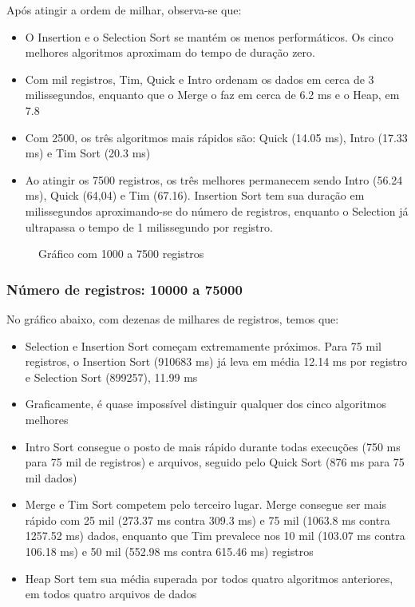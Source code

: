 \documentclass[a4paper,12pt]{scrartcl}
\begin{document}
Após atingir a ordem de milhar, observa-se que:
\begin{itemize}
    \item
    O Insertion e o Selection Sort se mantém os menos performáticos. Os cinco melhores algoritmos aproximam do tempo de duração zero.
    
    \item
    Com mil registros, Tim, Quick e Intro ordenam os dados em cerca de 3 milissegundos, enquanto que o Merge o faz em cerca de 6.2 ms e o Heap, em 7.8
    
    \item
    Com 2500, os três algoritmos mais rápidos são: Quick (14.05 ms), Intro (17.33 ms) e Tim Sort (20.3 ms)

    \item
    Ao atingir os 7500 registros, os três melhores permanecem sendo Intro (56.24 ms), Quick (64,04) e Tim (67.16). Insertion Sort tem sua duração em milissegundos aproximando-se do número de registros, enquanto o Selection já ultrapassa o tempo de 1 milissegundo por registro.


\end{itemize}

\begin{figure}[H]
    \centering
    
    \caption{Gráfico com 1000 a 7500 registros}
    \label{mapaSelect}
\end{figure}

\subsubsection{Número de registros: 10000 a 75000}

No gráfico abaixo, com dezenas de milhares de registros, temos que:
\begin{itemize}
    \item
    Selection e Insertion Sort começam extremamente próximos. Para 75 mil registros, o Insertion Sort (910683 ms) já leva em média 12.14 ms por registro e Selection Sort (899257), 11.99 ms
    
    \item
    Graficamente, é quase impossível distinguir qualquer dos cinco algoritmos melhores
    
    \item
    Intro Sort consegue o posto de mais rápido durante todas execuções (750 ms para 75 mil de registros) e arquivos, seguido pelo Quick Sort (876 ms para 75 mil dados)
    
    \item Merge e Tim Sort competem pelo terceiro lugar. Merge consegue ser mais rápido com 25 mil (273.37 ms contra 309.3 ms) e 75 mil (1063.8 ms contra 1257.52 ms) dados, enquanto que Tim prevalece nos 10 mil (103.07 ms contra 106.18 ms) e 50 mil (552.98 ms contra 615.46 ms) registros
    
    \item
    Heap Sort tem sua média superada por todos quatro algoritmos anteriores, em todos quatro arquivos de dados

\end{itemize}
\end{document}
